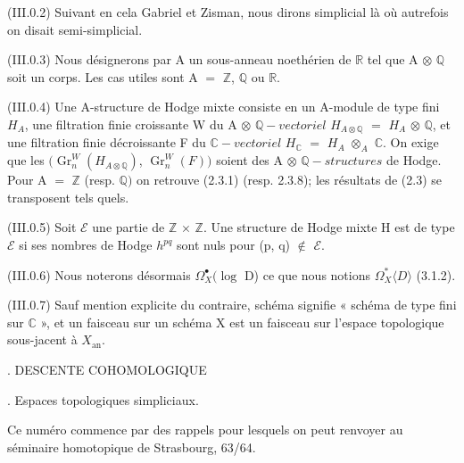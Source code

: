 \documentclass[11pt,twoside]{article}
\begin{document}
(III.0.2) Suivant en cela Gabriel et Zisman, nous dirons simplicial là où autrefois on disait semi-simplicial.\par
\par\medskip
(III.0.3) Nous désignerons par A un sous-anneau noethérien de \(\mathbb{R}\) tel que A \(\otimes \) \(\mathbb{Q}\) soit un corps. Les cas utiles sont A \(=\) \(\mathbb{Z}\), \(\mathbb{Q}\) ou \(\mathbb{R}\).\par
\par\medskip
(III.0.4) Une A-structure de Hodge mixte consiste en un A-module de type fini \(H_{A}\), une filtration finie croissante W du A \(\otimes \) \(\mathbb{Q}-vectoriel\) \(H_{A\otimes \mathbb{Q}}\) \(=\) \(H_{A}\) \(\otimes \) \(\mathbb{Q}\), et une filtration finie décroissante F du \(\mathbb{C}-vectoriel\) \(H_{\mathbb{C}}\) \(=\) \(H_{A}\) \(\otimes _{A}\) \(\mathbb{C}\). On exige que les \((\operatorname{Gr}_{n}^{W}(H_{A\otimes \mathbb{Q}})\), \(\operatorname{Gr}_{n}^{W}(F))\) soient des A \(\otimes \) \(\mathbb{Q}-structures\) de Hodge. Pour A \(=\) \(\mathbb{Z}\) (resp. \(\mathbb{Q})\) on retrouve (2.3.1) (resp. 2.3.8); les résultats de (2.3) se transposent tels quels.\par
\par\medskip
(III.0.5) Soit \(\mathcal{E}\) une partie de \(\mathbb{Z}\) \(\times \) \(\mathbb{Z}\). Une structure de Hodge mixte H est de type \(\mathcal{E}\) si ses nombres de Hodge \(h^{pq}\) sont nuls pour (p, q) \(\notin \) \(\mathcal{E}\).\par
\par\medskip
(III.0.6) Nous noterons désormais \(\Omega _{X}^{\bullet }(\operatorname{log}\) D) ce que nous notions \(\Omega _{X}^{\ast }⟨D⟩\) (3.1.2).\par
\par\medskip
(III.0.7) Sauf mention explicite du contraire, schéma signifie « schéma de type fini sur \(\mathbb{C}\) », et un faisceau sur un schéma X est un faisceau sur l’espace topologique sous-jacent à \(X_{\mathrm{an}}\).\par
\par{}. DESCENTE COHOMOLOGIQUE\par
\par{}. Espaces topologiques simpliciaux.\par
\par\medskip
Ce numéro commence par des rappels pour lesquels on peut renvoyer au séminaire homotopique de Strasbourg, 63/64.\par
\par\medskip
\end{document}
